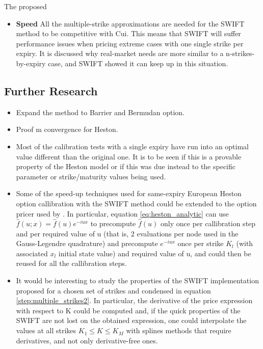 \documentclass[12,twoside]{mammeTFM}
\theoremstyle{definition}
\theoremstyle{remark}
\begin{document}
The proposed 

\begin{itemize}

\item \textbf{Speed}
All the multiple-strike approximations are needed for the SWIFT method to be competitive with Cui. This means that SWIFT will suffer performance issues when pricing extreme cases with one single strike per expiry. It is discussed why real-market needs are more similar to a n-strikes-by-expiry case, and SWIFT showed it can keep up in this situation.

\end{itemize}

\subsection{Further Research}
\begin{itemize}

\item Expand the method to Barrier and Bermudan option.

\item Proof m convergence for Heston.

\item Most of the calibration tests with a single expiry have run into an optimal value different than the original one. It is to be seen if this is a provable property of the Heston model or if this was due instead to the specific parameter or strike/maturity values being used.

\item Some of the speed-up techniques used for same-expiry European Heston option callibration with the SWIFT method could be extended to the option pricer used by \cite{cui17}. In particular, equation \ref{eq:heston_analytic} can use $\hat{f}(u; x) = \hat{f}(u) e^{-i u x}$ to precompute $\hat{f}(u)$ only once per callibration step and per required value of u (that is, 2 evaluations per node used in the Gauss-Legendre quadrature) and precompute $e^{-i u x}$ once per strike $K_l$ (with associated $x_l$ initial state value) and required value of u, and could then be reused for all the callibration steps.

\item It would be interesting to study the properties of the SWIFT implementation proposed for a chosen set of strikes and condensed in equation \ref{step:multiple_strikes2}. In particular, the derivative of the price expression with respect to K could be computed and, if the quick properties of the SWIFT are not lost on the obtained expression, one could interpolate the values at all strikes $K_1 \leq K \leq K_M$ with splines methods that require derivatives, and not only derivative-free ones.

\end{itemize}
\end{document}
